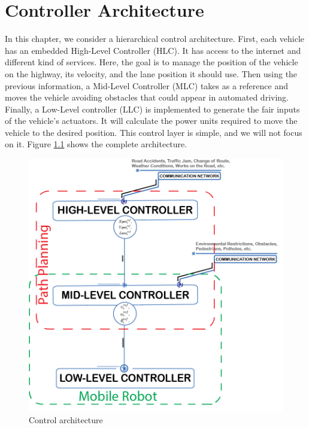 \chapter{Controller Architecture}
\label{controller_architecture}

In this chapter, we consider a hierarchical control architecture. First, each vehicle has an embedded High-Level Controller (HLC). It has access to the internet and different kind of services. Here, the goal is to manage the position of the vehicle on the highway, its velocity, and the lane position it should use. Then using the previous information, a Mid-Level Controller (MLC) takes as a reference and moves the vehicle avoiding obstacles that could appear in automated driving. Finally, a Low-Level controller (LLC) is implemented to generate the fair inputs of the vehicle's actuators. It will calculate the power units required to move the vehicle to the desired position. This control layer is simple, and we will not focus on it. Figure \ref{fig:control_architecture} shows the complete architecture. 

\begin{figure}[H]
    \centering
    \includegraphics[width=1\textwidth]{Kap4/architecture.png}
    \caption{Control architecture}
    \label{fig:control_architecture}
\end{figure}

